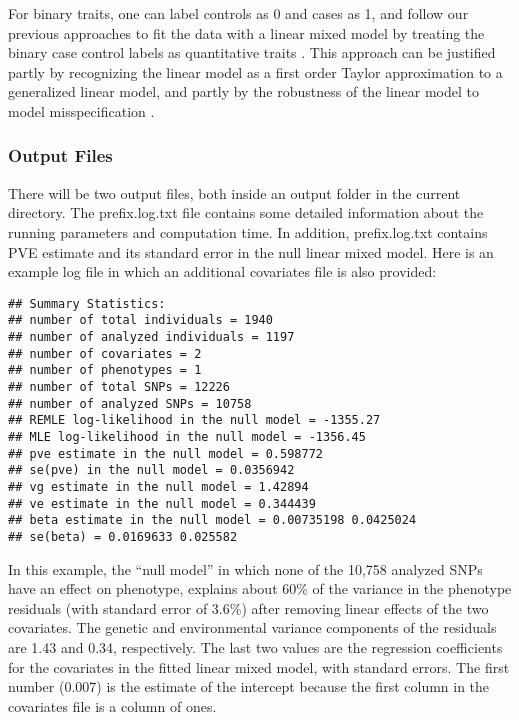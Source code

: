 \documentclass[11pt]{article}
\begin{document}
For binary traits, one can label controls as 0 and cases as 1, and
follow our previous approaches to fit the data with a linear mixed
model by treating the binary case control labels as quantitative
traits \cite{Zhou:2012, Zhou:2013}. This approach can be justified
partly by recognizing the linear model as a first order Taylor
approximation to a generalized linear model, and partly by the
robustness of the linear model to model misspecification
\cite{Zhou:2013}.

\subsubsection{Output Files}

There will be two output files, both inside an output folder in the
current directory. The prefix.log.txt file contains some detailed
information about the running parameters and computation time. In
addition, prefix.log.txt contains PVE estimate and its standard error
in the null linear mixed model. Here is an example log file in which
an additional covariates file is also provided:
%
\begin{verbatim}
## Summary Statistics:
## number of total individuals = 1940
## number of analyzed individuals = 1197
## number of covariates = 2
## number of phenotypes = 1
## number of total SNPs = 12226
## number of analyzed SNPs = 10758
## REMLE log-likelihood in the null model = -1355.27
## MLE log-likelihood in the null model = -1356.45
## pve estimate in the null model = 0.598772
## se(pve) in the null model = 0.0356942
## vg estimate in the null model = 1.42894
## ve estimate in the null model = 0.344439
## beta estimate in the null model = 0.00735198 0.0425024
## se(beta) = 0.0169633 0.025582
\end{verbatim}
%
In this example, the ``null model'' in which none of the 10,758
analyzed SNPs have an effect on phenotype, explains about 60\% of the
variance in the phenotype residuals (with standard error of 3.6\%)
after removing linear effects of the two covariates. The genetic and
environmental variance components of the residuals are 1.43 and 0.34,
respectively. The last two values are the regression coefficients for
the covariates in the fitted linear mixed model, with standard
errors. The first number (0.007) is the estimate of the intercept
because the first column in the covariates file is a column of ones.
\end{document}
